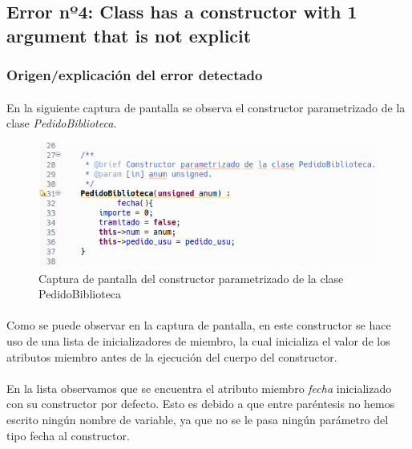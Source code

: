 	\subsection{Error nº4: Class has a constructor with 1 argument that is not explicit}
	
		\subsubsection{Origen/explicación del error detectado}
	
			\paragraph{}En la siguiente captura de pantalla se observa el constructor parametrizado de la clase \textit{PedidoBiblioteca}.
			
			\begin{figure}[H]
				\centering
				\includegraphics[scale=0.7]{img/captura51.png}
				\caption{Captura de pantalla del constructor parametrizado de la clase PedidoBiblioteca}
				\label{captura51}
			\end{figure}
		
			\paragraph{}Como se puede observar en la captura de pantalla, en este constructor se hace uso de una lista de inicializadores de miembro, la cual inicializa el valor de los atributos miembro antes de la ejecución del cuerpo del constructor.
			
			\paragraph{}En la lista observamos que se encuentra el atributo miembro \textit{fecha} inicializado con su constructor por defecto. Esto es debido a que entre paréntesis no hemos escrito ningún nombre de variable, ya que no se le pasa ningún parámetro del tipo fecha al constructor.
			
